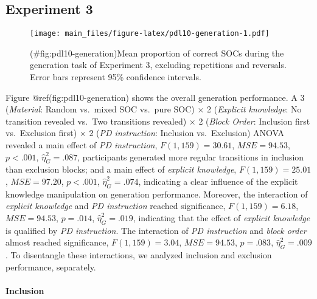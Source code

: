 \begin{appendix}
\subsection{Experiment 3}\label{experiment-3}

\begin{figure}
\centering
\texttt{[image: main\_files/figure-latex/pdl10-generation-1.pdf]}
\caption{(\#fig:pdl10-generation)Mean proportion of correct SOCs during
the generation task of Experiment 3, excluding repetitions and
reversals. Error bars represent 95\% confidence intervals.}
\end{figure}

Figure @ref(fig:pdl10-generation) shows the overall generation
performance. A 3 (\emph{Material}: Random vs.~mixed SOC vs.~pure SOC)
\(\times\) 2 (\emph{Explicit knowledge}: No transition revealed vs.~Two
transitions revealed) \(\times\) 2 (\emph{Block Order}: Inclusion first
vs.~Exclusion first) \(\times\) 2 (\emph{PD instruction}: Inclusion
vs.~Exclusion) ANOVA revealed a main effect of \emph{PD instruction},
\(F(1, 159) = 30.61\), \(\mathit{MSE} = 94.53\), \(p < .001\),
\(\hat{\eta}^2_G = .087\), participants generated more regular
transitions in inclusion than exclusion blocks; and a main effect of
\emph{explicit knowledge}, \(F(1, 159) = 25.01\),
\(\mathit{MSE} = 97.20\), \(p < .001\), \(\hat{\eta}^2_G = .074\),
indicating a clear influence of the explicit knowledge manipulation on
generation performance. Moreover, the interaction of \emph{explicit
knowledge} and \emph{PD instruction} reached significance,
\(F(1, 159) = 6.18\), \(\mathit{MSE} = 94.53\), \(p = .014\),
\(\hat{\eta}^2_G = .019\), indicating that the effect of \emph{explicit
knowledge} is qualified by \emph{PD instruction}. The interaction of
\emph{PD instruction} and \emph{block order} almost reached
significance, \(F(1, 159) = 3.04\), \(\mathit{MSE} = 94.53\),
\(p = .083\), \(\hat{\eta}^2_G = .009\). To disentangle these
interactions, we analyzed inclusion and exclusion performance,
separately.

\paragraph{Inclusion}\label{inclusion-1}


\end{appendix}
